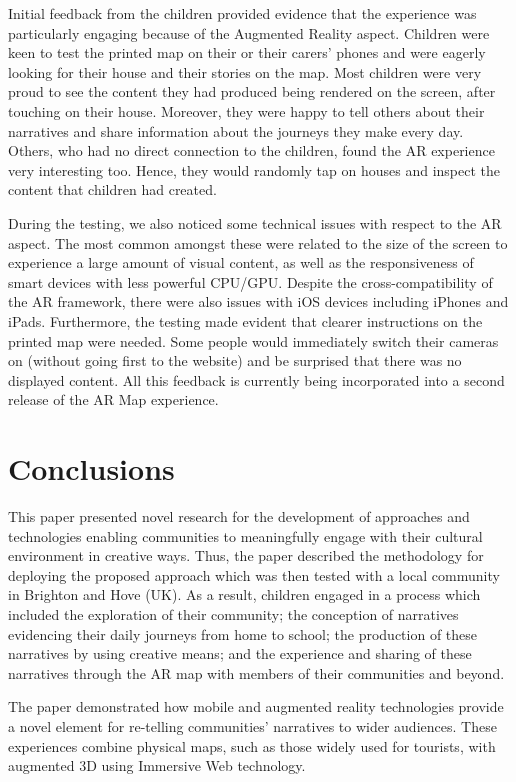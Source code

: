 \documentclass[acmlarge,screen,dvipsnames]{acmart}
\begin{document}
Initial feedback from the children provided evidence that the experience was
particularly engaging because of the Augmented Reality aspect. Children were keen to test
the printed map on their or their carers' phones and were eagerly looking for their house and their stories on the map.
Most children were very proud to see the content they had produced being
rendered on the screen, after touching on their house. Moreover, they were happy to tell
others about their narratives and share information about the journeys they make every day. Others, who had no
direct connection to the children, found the AR experience very interesting too.
Hence, they would randomly tap on houses and inspect the content that children had created.
 
 During the testing, we also noticed some technical issues with respect to the AR aspect. The
 most common amongst these were related to the size of the screen to experience a large
 amount of visual content, as well as the responsiveness of smart devices with less
 powerful CPU/GPU. Despite the cross-compatibility of the AR framework, there
 were also issues with iOS devices including iPhones and iPads. Furthermore,
 the testing made evident that clearer instructions on the printed map
 were needed. Some people would immediately switch their cameras on (without
 going first to the website) and be surprised that there was no displayed content. All this feedback is currently being incorporated into a second release of the AR Map experience. 


\section{Conclusions} \label{conc} This paper presented novel research for the
development of approaches and technologies enabling communities to
meaningfully engage with their cultural environment in creative ways. Thus,
the paper described the methodology for deploying the proposed approach which was then tested
with a local community in Brighton and Hove (UK). As a result, children
engaged in a process which included the exploration of their community; the conception of narratives evidencing their daily journeys from home to school; the production of these narratives by using creative means; and the experience and sharing of these narratives through the AR map with members of their communities and beyond.

The paper demonstrated how mobile and augmented reality technologies provide a
novel element for re-telling communities' narratives to wider audiences. These
experiences combine physical maps, such as those widely used for tourists,
with augmented 3D using Immersive Web technology. 
\end{document}
